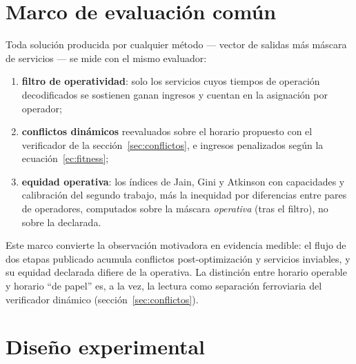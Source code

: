 \documentclass[11pt,a4paper]{article}
\begin{document}
\section{Marco de evaluación común}
\label{sec:evaluacion}

Toda solución producida por cualquier método --- vector de salidas más
máscara de servicios --- se mide con el mismo evaluador:

\begin{enumerate}
\item \textbf{filtro de operatividad}: solo los servicios cuyos tiempos de
operación decodificados se sostienen ganan ingresos y cuentan en la
asignación por operador;
\item \textbf{conflictos dinámicos} reevaluados sobre el horario propuesto
con el verificador de la sección~\ref{sec:conflictos}, e ingresos penalizados
según la ecuación~\eqref{ec:fitness};
\item \textbf{equidad operativa}: los índices de Jain, Gini y Atkinson con
capacidades y calibración del segundo trabajo, más la inequidad por
diferencias entre pares de operadores, computados sobre la máscara
\emph{operativa} (tras el filtro), no sobre la declarada.
\end{enumerate}

Este marco convierte la observación motivadora en evidencia medible: el
flujo de dos etapas publicado acumula conflictos post-optimización y
servicios inviables, y su equidad declarada difiere de la operativa. La
distinción entre horario operable y horario ``de papel'' es, a la vez, la
lectura como separación ferroviaria del verificador dinámico
(sección~\ref{sec:conflictos}).

\section{Diseño experimental}
\label{sec:diseno}
\end{document}
